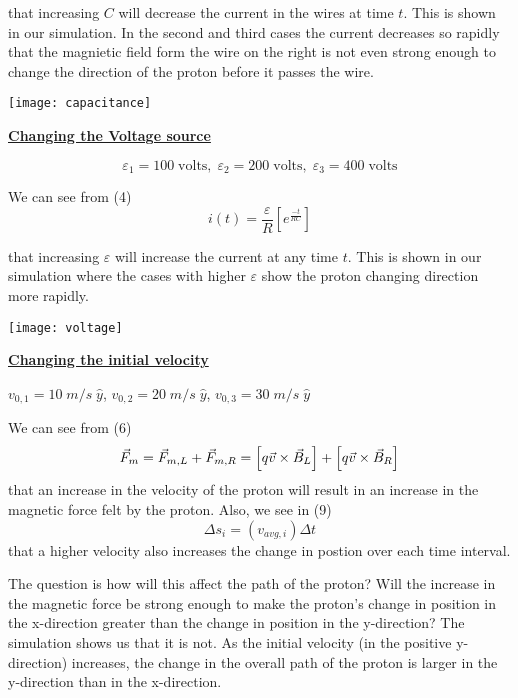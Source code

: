 \documentclass[11pt]{article}
\begin{document}
\noindent that increasing $C$ will decrease the current in the wires at time $t$. This is shown in our simulation. In the second and third cases the current decreases so rapidly that the magnietic field form the wire on the right is not even strong enough to change the direction of the proton before it passes the wire. 
\vspace{.5in}

\begin{center}
\texttt{[image: capacitance]}
\end{center}

\newpage
\begin{center}
{\bf\underline{Changing the Voltage source}}
\end{center}
\[
\varepsilon_1=100\;\text{volts},\;\varepsilon_2=200\;\text{volts},\; \varepsilon_3=400\;\text{volts}
\]

\noindent We can see from (4) 
\[
i(t)=\frac{\varepsilon}{R}\left[e^{\frac{-t}{RC}}\right]
\]

\noindent that increasing $\varepsilon$ will increase the current at any time $t$. This is shown in our simulation where the cases with higher $\varepsilon$ show the proton changing direction more rapidly.
\vspace{.5in}

\begin{center}
\texttt{[image: voltage]}
\end{center}

\newpage
\begin{center}
{\bf\underline{Changing the initial velocity}}
\end{center}

\begin{center}
	$v_{0,1}=10\;m/s\;\hat{y}$, $v_{0,2}=20\;m/s\;\hat{y}$, $v_{0,3}=30\;m/s\;\hat{y}$
\end{center}
\noindent We can see from (6)
\[
\vec{F}_m=\vec{F}_{m,L}+\vec{F}_{m,R}\\=\left[q\vec{v}\times\vec{B}_L\right]+\left[q\vec{v}\times\vec{B}_R\right]
\]
\noindent that an increase in the velocity of the proton will result in an increase in the magnetic force felt by the proton. Also, we see in (9) 
\[
\Delta s_i=\left(v_{avg,i}\right)\Delta t
\]
\noindent that a higher velocity also increases the change in postion over each time interval. 
\vspace{.2in}

\noindent The question is how will this affect the path of the proton? Will the increase in the magnetic force be strong enough to make the proton's change in position in the x-direction greater than the change in position in the y-direction? The simulation shows us that it is not. As the initial velocity (in the positive y-direction) increases, the change in the overall path of the proton is larger in the y-direction than in the x-direction.
\vspace{.5in}
\end{document}
